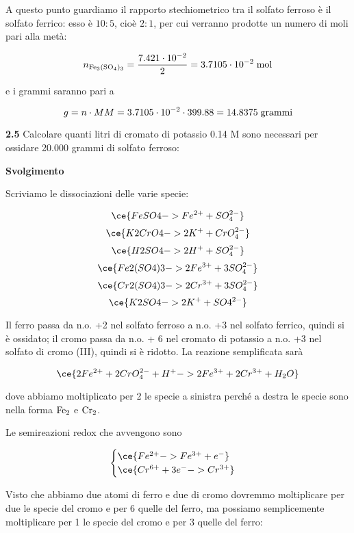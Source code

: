 A questo punto guardiamo il rapporto stechiometrico tra il solfato ferroso è il solfato ferrico: esso è $10:5$, cioè $2:1$, per cui verranno prodotte un numero di moli pari alla metà:

$$n_{\rm Fe_3(SO_4)_3}=\frac{7.421 \cdot 10^{-2}}{2}=3.7105 \cdot 10^{-2} \; \rm mol$$

e i grammi saranno pari a

$$g=n \cdot MM=3.7105 \cdot 10^{-2} \cdot 399.88=14.8375 \; \rm grammi$$

\vspace{0.2cm}\textbf{2.5} Calcolare quanti litri di cromato di potassio 0.14 M sono necessari per ossidare 20.000 grammi di solfato ferroso:
\begin{center}

\end{center}

\large\textbf{Svolgimento}\normalsize

\vspace{0.2cm}Scriviamo le dissociazioni delle varie specie:

$$\ce{FeSO4 -> Fe^{2+} + SO_4^{2-}}$$
$$\ce{K2CrO4 -> 2K^+ + CrO_4^{2-}}$$
$$\ce{H2SO4 -> 2H^+ + SO_4^{2-}}$$
$$\ce{Fe2(SO4)3 -> 2Fe^{3+} + 3SO_4^{2-}}$$
$$\ce{Cr2(SO4)3 -> 2Cr^{3+} + 3SO_4^{2-}}$$
$$\ce{K2SO4 -> 2K^+ + SO4^{2-}}$$

Il ferro passa da n.o. +2 nel solfato ferroso a n.o. +3 nel solfato ferrico, quindi si è ossidato; il cromo passa da n.o. + 6 nel cromato di potassio a n.o. +3 nel solfato di cromo (III), quindi si è ridotto. La reazione semplificata sarà

$$\ce{2Fe^{2+} + 2CrO_4^{2-} + H^+ -> 2Fe^{3+} + 2Cr^{3+} + H_2O}$$

dove abbiamo moltiplicato per 2 le specie a sinistra perché a destra le specie sono nella forma $\rm Fe_2$ e $\rm Cr_2$.

Le semireazioni redox che avvengono sono

$$\begin{cases}
    \ce{Fe^{2+} -> Fe^{3+} + e^-}\\
    \ce{Cr^{6+} + 3e^- -> Cr^{3+}}
\end{cases}$$

Visto che abbiamo due atomi di ferro e due di cromo dovremmo moltiplicare per due le specie del cromo e per 6 quelle del ferro, ma possiamo semplicemente moltiplicare per 1 le specie del cromo e per 3 quelle del ferro:

